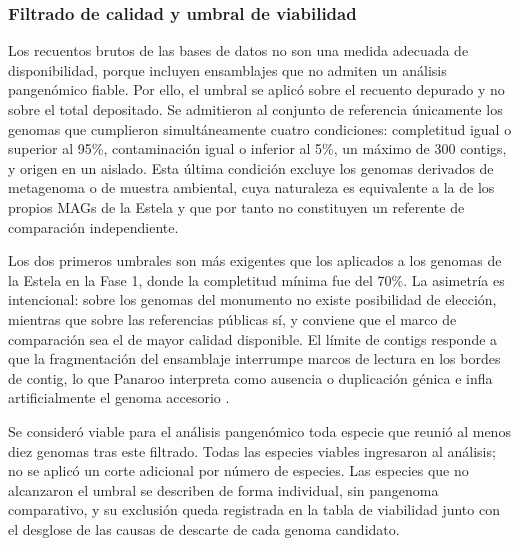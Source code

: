\subsubsection{Filtrado de calidad y umbral de viabilidad}

Los recuentos brutos de las bases de datos no son una medida adecuada de disponibilidad, porque incluyen ensamblajes que no admiten un análisis pangenómico fiable. Por ello, el umbral se aplicó sobre el recuento depurado y no sobre el total depositado. Se admitieron al conjunto de referencia únicamente los genomas que cumplieron simultáneamente cuatro condiciones: completitud igual o superior al 95\%, contaminación igual o inferior al 5\%, un máximo de 300 contigs, y origen en un aislado. Esta última condición excluye los genomas derivados de metagenoma o de muestra ambiental, cuya naturaleza es equivalente a la de los propios MAGs de la Estela y que por tanto no constituyen un referente de comparación independiente.

Los dos primeros umbrales son más exigentes que los aplicados a los genomas de la Estela en la Fase 1, donde la completitud mínima fue del 70\%. La asimetría es intencional: sobre los genomas del monumento no existe posibilidad de elección, mientras que sobre las referencias públicas sí, y conviene que el marco de comparación sea el de mayor calidad disponible. El límite de contigs responde a que la fragmentación del ensamblaje interrumpe marcos de lectura en los bordes de contig, lo que Panaroo interpreta como ausencia o duplicación génica e infla artificialmente el genoma accesorio \cite{panaroo2020}.

Se consideró viable para el análisis pangenómico toda especie que reunió al menos diez genomas tras este filtrado. Todas las especies viables ingresaron al análisis; no se aplicó un corte adicional por número de especies. Las especies que no alcanzaron el umbral se describen de forma individual, sin pangenoma comparativo, y su exclusión queda registrada en la tabla de viabilidad junto con el desglose de las causas de descarte de cada genoma candidato.

